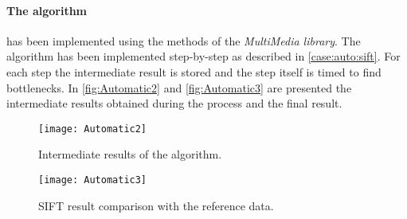 \paragraph{The algorithm} has been implemented using the methods of the
\emph{MultiMedia library}. The algorithm has been implemented step-by-step
as described in \ref{case:auto:sift}. For each step the intermediate result
is stored and the step itself is timed to find bottlenecks. In
\autoref{fig:Automatic2} and \autoref{fig:Automatic3} are presented the
intermediate results obtained during the process and the final result.
\begin{figure}[htb]
    \centering
    \texttt{[image: Automatic2]}
    \caption{Intermediate results of the algorithm.}
    \label{fig:Automatic2}
\end{figure}

\begin{figure}[htb]
    \centering
    \texttt{[image: Automatic3]}
    \caption{\acs{SIFT} result comparison with the reference data.}
    \label{fig:Automatic3}
\end{figure}





